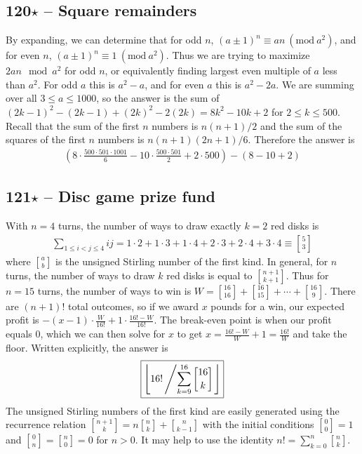 \documentclass{article}
\newcommand{\stirling}[2]{\genfrac{[}{]}{0pt}{}{#1}{#2}}
\newcommand{\Mod}[1]{\ (\mathrm{mod}\ #1)}
\begin{document}
\subsection*{120$\star$ -- Square remainders} 
By expanding, we can determine that for odd $n$, $(a \pm 1)^n \equiv an \Mod{a^2}$, and for even $n$, $(a \pm 1)^n \equiv 1 \Mod{a^2}$. 
Thus we are trying to maximize $2an \mod a^2$ for odd $n$, or equivalently finding largest even multiple of $a$ less than $a^2$. 
For odd $a$ this is $a^2 - a$, and for even $a$ this is $a^2 - 2a$. 
We are summing over all $3 \leq a \leq 1000$, so the answer is the sum of $(2k-1)^2 - (2k-1) + (2k)^2 - 2(2k) = 8k^2 - 10k + 2$ for $2 \leq k \leq 500$. 
Recall that the sum of the first $n$ numbers is $n(n+1)/2$ and the sum of the squares of the first $n$ numbers is $n(n+1)(2n+1)/6$. 
Therefore the answer is
\begin{align*}
	\boxed{ \left(8\cdot\frac{500\cdot501\cdot1001}{6} - 10\cdot\frac{500\cdot501}{2} + 2\cdot500\right) - (8-10+2) }
\end{align*}

\subsection*{121$\star$ -- Disc game prize fund}  
With $n=4$ turns, the number of ways to draw exactly $k=2$ red disks is 
\begin{align*}
	\sum_{1 \leq i < j \leq 4} i j = 1\cdot2 + 1\cdot3 + 1\cdot4 + 2\cdot3 + 2\cdot4 + 3\cdot4 \equiv \stirling{5}{3}
\end{align*}
where $\stirling{a}{b}$ is the unsigned Stirling number of the first kind.
In general, for $n$ turns, the number of ways to draw $k$ red disks is equal to $\stirling{n+1}{k+1}$.
Thus for $n = 15$ turns, the number of ways to win is $W = \stirling{16}{16} + \stirling{16}{15} + \cdots + \stirling{16}{9}$. 
There are $(n+1)!$ total outcomes, so if we award $x$ pounds for a win, our expected profit is $-(x-1)\cdot\frac{W}{16!} + 1\cdot\frac{16!-W}{16!}$. 
The break-even point is when our profit equals 0, which we can then solve for $x$ to get $x = \frac{16!-W}{W}+1 = \frac{16!}{W}$ and take the floor. 
Written explicitly, the answer is
\begin{align*}
	\boxed{ \left\lfloor16! \left/ \sum_{k=9}^{16} \stirling{16}{k} \right. \right\rfloor}
\end{align*}
The unsigned Stirling numbers of the first kind are easily generated using the recurrence relation $\stirling{n+1}{k} = n\stirling{n}{k} + \stirling{n}{k-1}$ with the initial conditions $\stirling{0}{0} = 1$ and $\stirling{0}{n} = \stirling{n}{0} = 0$ for $n > 0$. 
It may help to use the identity $n! = \sum_{k=0}^n \stirling{n}{k}$.
\end{document}
